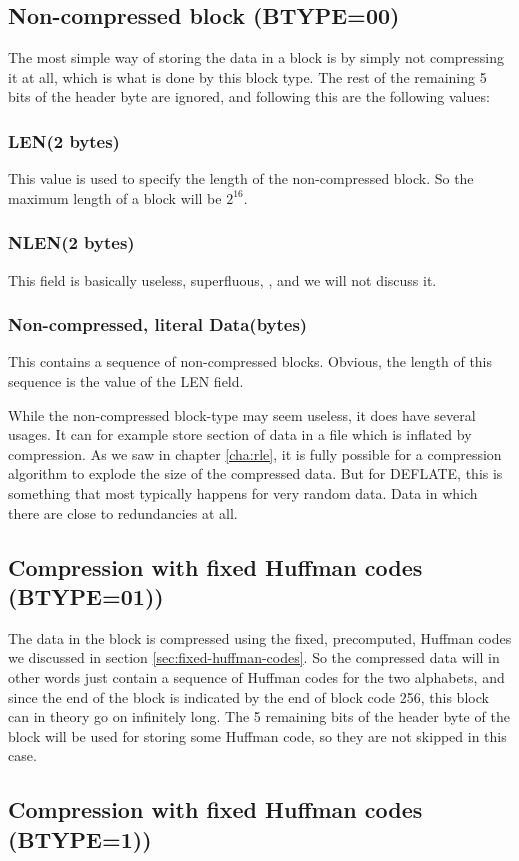 \subsection{Non-compressed block (BTYPE=00)}

The most simple way of storing the data in a block is by simply not
compressing it at all, which is what is done by this block type. The
rest of the remaining 5 bits of the header byte are ignored, and
following this are the following values:

\subsubsection{LEN(2 bytes)}

This value is used to specify the length of the non-compressed
block. So the maximum length of a block will be $2 ^{16}$.

\subsubsection{NLEN(2 bytes)}

This field is basically useless, superfluous, , and we will not discuss it.

\subsubsection{Non-compressed, literal Data(bytes)}

This contains a sequence of non-compressed blocks. Obvious, the length
of this sequence is the value of the LEN field.

While the non-compressed block-type may seem useless, it does have
several usages. It can for example store section of data in a file
which is inflated by compression. As we saw in chapter \ref{cha:rle},
it is fully possible for a compression algorithm to explode the size
of the compressed data. But for DEFLATE, this is something that most
typically happens for very random data. Data in which there are close
to redundancies at all.

\subsection{Compression with fixed Huffman codes (BTYPE=01))}

The data in the block is compressed using the fixed, precomputed,
Huffman codes we discussed in section
\ref{sec:fixed-huffman-codes}. So the compressed data will in other
words just contain a sequence of Huffman codes for the two alphabets,
and since the end of the block is indicated by the end of block code
256, this block can in theory go on infinitely long. The 5 remaining
bits of the header byte of the block will be used for storing some
Huffman code, so they are not skipped in this case.

\subsection{Compression with fixed Huffman codes (BTYPE=1))}